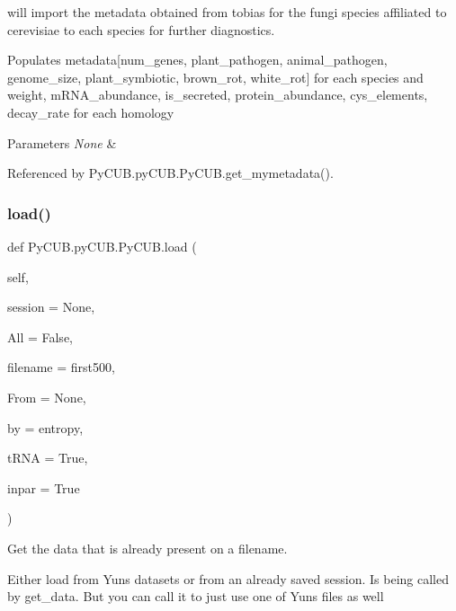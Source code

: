 will import the metadata obtained from tobias for the fungi species affiliated to cerevisiae to each species for further diagnostics. 

Populates metadata\mbox{[}num\+\_\+genes, plant\+\_\+pathogen, animal\+\_\+pathogen, genome\+\_\+size, plant\+\_\+symbiotic, brown\+\_\+rot, white\+\_\+rot\mbox{]} for each species and weight, m\+R\+N\+A\+\_\+abundance, is\+\_\+secreted, protein\+\_\+abundance, cys\+\_\+elements, decay\+\_\+rate for each homology


\begin{DoxyParams}{Parameters}
{\em None} & \\
\hline
\end{DoxyParams}


Referenced by Py\+C\+U\+B.\+py\+C\+U\+B.\+Py\+C\+U\+B.\+get\+\_\+mymetadata().

\mbox{\label{class_py_c_u_b_1_1py_c_u_b_1_1_py_c_u_b_ab471e823b0eba23af5a5322008ec09da}} 
\subsubsection{\texorpdfstring{load()}{load()}}
{\footnotesize\ttfamily def Py\+C\+U\+B.\+py\+C\+U\+B.\+Py\+C\+U\+B.\+load (\begin{DoxyParamCaption}\item[{}]{self,  }\item[{}]{session = {\ttfamily None},  }\item[{}]{All = {\ttfamily False},  }\item[{}]{filename = {\ttfamily \textquotesingle{}first500\textquotesingle{}},  }\item[{}]{From = {\ttfamily None},  }\item[{}]{by = {\ttfamily \textquotesingle{}entropy\textquotesingle{}},  }\item[{}]{t\+R\+NA = {\ttfamily True},  }\item[{}]{inpar = {\ttfamily True} }\end{DoxyParamCaption})}



Get the data that is already present on a filename. 

Either load from Yun\textquotesingle{}s datasets or from an already saved session. Is being called by get\+\_\+data. But you can call it to just use one of Yun\textquotesingle{}s files as well


